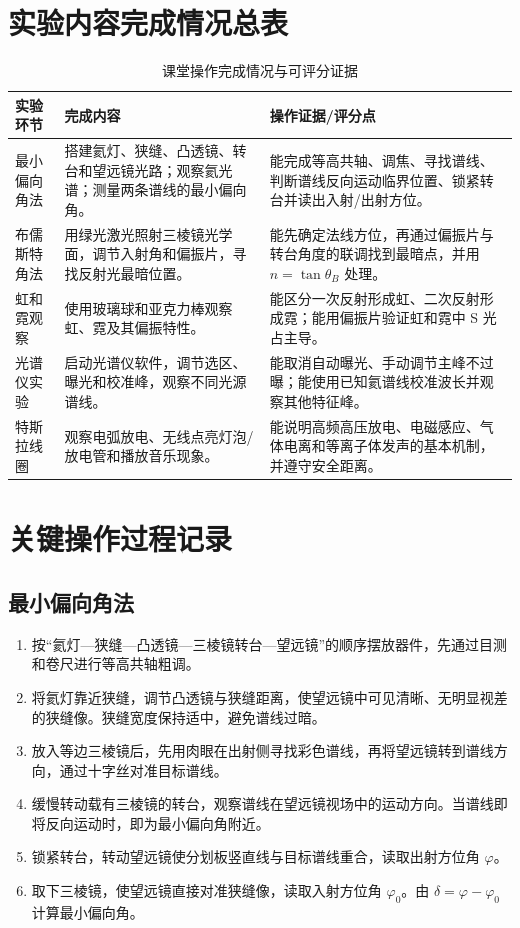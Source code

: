 \documentclass[UTF8,12pt,a4paper]{ctexart}
\begin{document}
\section{实验内容完成情况总表}

\begin{table}[H]
\centering
\caption{课堂操作完成情况与可评分证据}
\small
\begin{tabularx}{0.96\textwidth}{p{}p{}Y}
\toprule
实验环节 & 完成内容 & 操作证据/评分点 \\
\midrule
最小偏向角法 & 搭建氦灯、狭缝、凸透镜、转台和望远镜光路；观察氦光谱；测量两条谱线的最小偏向角。 & 能完成等高共轴、调焦、寻找谱线、判断谱线反向运动临界位置、锁紧转台并读出入射/出射方位。 \\
布儒斯特角法 & 用绿光激光照射三棱镜光学面，调节入射角和偏振片，寻找反射光最暗位置。 & 能先确定法线方位，再通过偏振片与转台角度的联调找到最暗点，并用 \(n=\tan\theta_B\) 处理。 \\
虹和霓观察 & 使用玻璃球和亚克力棒观察虹、霓及其偏振特性。 & 能区分一次反射形成虹、二次反射形成霓；能用偏振片验证虹和霓中 S 光占主导。 \\
光谱仪实验 & 启动光谱仪软件，调节选区、曝光和校准峰，观察不同光源谱线。 & 能取消自动曝光、手动调节主峰不过曝；能使用已知氦谱线校准波长并观察其他特征峰。 \\
特斯拉线圈 & 观察电弧放电、无线点亮灯泡/放电管和播放音乐现象。 & 能说明高频高压放电、电磁感应、气体电离和等离子体发声的基本机制，并遵守安全距离。 \\
\bottomrule
\end{tabularx}
\end{table}

\section{关键操作过程记录}

\subsection{最小偏向角法}

\begin{enumerate}[label=\arabic*.,leftmargin=2.2em]
    \item 按“氦灯—狭缝—凸透镜—三棱镜转台—望远镜”的顺序摆放器件，先通过目测和卷尺进行等高共轴粗调。
    \item 将氦灯靠近狭缝，调节凸透镜与狭缝距离，使望远镜中可见清晰、无明显视差的狭缝像。狭缝宽度保持适中，避免谱线过暗。
    \item 放入等边三棱镜后，先用肉眼在出射侧寻找彩色谱线，再将望远镜转到谱线方向，通过十字丝对准目标谱线。
    \item 缓慢转动载有三棱镜的转台，观察谱线在望远镜视场中的运动方向。当谱线即将反向运动时，即为最小偏向角附近。
    \item 锁紧转台，转动望远镜使分划板竖直线与目标谱线重合，读取出射方位角 \(\varphi\)。
    \item 取下三棱镜，使望远镜直接对准狭缝像，读取入射方位角 \(\varphi_0\)。由 \(\delta=\varphi-\varphi_0\) 计算最小偏向角。
\end{enumerate}
\end{document}
